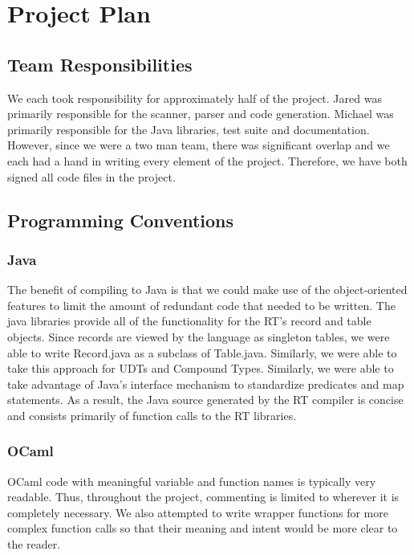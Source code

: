               
\chapter{Project Plan}

\section{Team Responsibilities}
We each took responsibility for approximately half of the project. Jared was primarily responsible for 
the scanner, parser and code generation. Michael was primarily responsible for the Java libraries, test 
suite and documentation. However, since we were a two man team, there was significant overlap and we each
had a hand in writing every element of the project. Therefore, we have both signed all code files in the 
project.

\section{Programming Conventions}

\subsection{Java}
The benefit of compiling to Java is that we could make use of the object-oriented features to limit the 
amount of redundant code that needed to be written. The java libraries provide all of the functionality 
for the RT’s record and table objects. Since records are viewed by the language as singleton tables, we 
were able to write Record.java as a subclass of Table.java. Similarly, we were able to take this approach 
for UDTs and Compound Types. Similarly, we were able to take advantage of Java’s interface mechanism to 
standardize predicates and map statements.  As a result, the Java source generated by the RT compiler is 
concise and consists primarily of function calls to the RT libraries.

\subsection{OCaml}
OCaml code with meaningful variable and function names is typically very readable. Thus, throughout 
the project, commenting is limited to wherever it is completely necessary. We also attempted to write 
wrapper functions for more complex function calls so that their meaning and intent would be more clear 
to the reader. 


